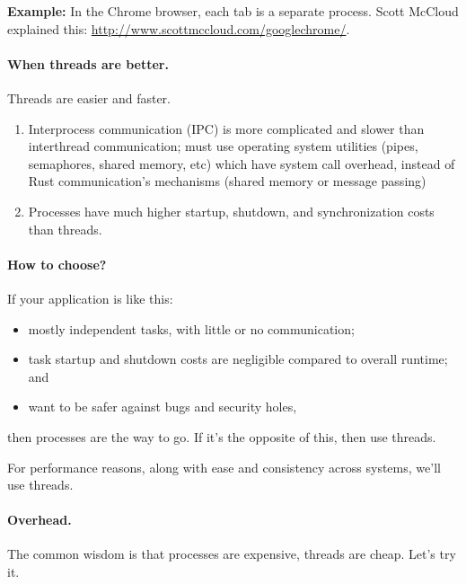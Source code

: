 \documentclass[a4paper]{report}
\begin{document}
{\bf Example:} In the Chrome browser, each tab is a separate
process. Scott McCloud explained this:
\url{http://www.scottmccloud.com/googlechrome/}.

\paragraph{When threads are better.} Threads are easier and faster.

  \begin{enumerate}
    \item Interprocess communication (IPC) is more complicated and slower than interthread
          communication; must use operating system utilities (pipes, semaphores, shared
              memory, etc) which have system call overhead, instead of Rust communication's mechanisms (shared memory or message passing)
	\item Processes have much higher startup, shutdown, and synchronization costs than threads.
  \end{enumerate}

\paragraph{How to choose?}
  If your application is like this:
  \begin{itemize}
    \item mostly independent tasks, with little or no communication;
    \item task startup and shutdown costs are negligible compared to overall runtime; and
    \item want to be safer against bugs and security holes,
  \end{itemize}
then processes are the way to go. If it's the opposite of this, then use threads.

For performance reasons, along with ease and consistency across systems, we'll use threads.

\paragraph{Overhead.} The common wisdom is that processes are
expensive, threads are cheap. Let's try it.
\end{document}
